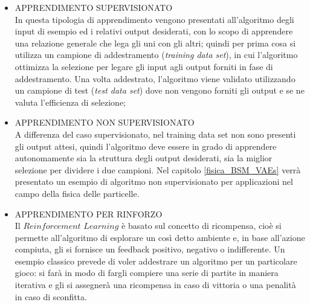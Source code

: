 \begin{itemize}
	
	\item APPRENDIMENTO SUPERVISIONATO \\
	In questa tipologia di apprendimento vengono presentati all'algoritmo degli input di esempio ed i relativi output desiderati, con lo scopo di apprendere una relazione generale che lega gli uni con gli altri; quindi per prima cosa si utilizza un campione di addestramento (\textit{training data set}), in cui l'algoritmo ottimizza la selezione per legare gli input agli output forniti in fase di addestramento. Una volta addestrato, l'algoritmo viene validato utilizzando un campione di test (\textit{test data set}) dove non vengono forniti gli output e se ne valuta l'efficienza di selezione;
	
	\item APPRENDIMENTO NON SUPERVISIONATO \\
	A differenza del caso supervisionato, nel training data set non sono presenti gli output attesi, quindi l'algoritmo deve essere in grado di apprendere autonomamente sia la struttura degli output desiderati, sia la miglior selezione per dividere i due campioni.
	Nel capitolo \ref{fisica_BSM_VAEs} verrà presentato un esempio di algoritmo non supervisionato per applicazioni nel campo della fisica delle particelle.
	
	\item APPRENDIMENTO PER RINFORZO \\
	Il $\textit{Reinforcement Learning}$ è basato sul concetto di ricompensa, cioè si permette all'algoritmo di esplorare un così detto ambiente e, in base all'azione compiuta, gli si fornisce un feedback positivo, negativo o indifferente. Un esempio classico prevede di voler addestrare un algoritmo per un particolare gioco: si farà in modo di fargli compiere una serie di partite in maniera iterativa e gli si assegnerà una ricompensa in caso di vittoria o una penalità in caso di sconfitta. \\ 
\end{itemize}

\newpage

